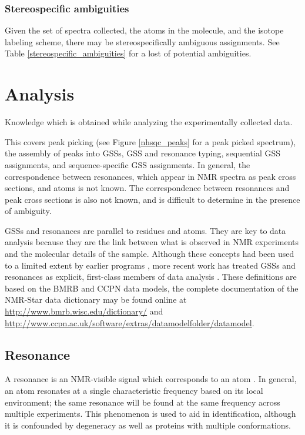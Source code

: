 \subsubsection{Stereospecific ambiguities}
Given the set of spectra collected, the atoms in the molecule, and the isotope
labeling scheme, there may be stereospecifically ambiguous assignments.  See
Table \ref{stereospecific_ambiguities} for a lost of potential ambiguities.



\section{Analysis}
Knowledge which is obtained while analyzing the experimentally collected data.

This covers peak picking (see Figure \ref{nhsqc_peaks} for a peak picked spectrum), 
the assembly of peaks into GSSs, GSS and resonance typing, sequential
GSS assignments, and sequence-specific GSS assignments.
In general, the correspondence between resonances, which appear in NMR 
spectra as peak cross sections, and atoms is not known.  The correspondence 
between resonances and peak cross sections is also not known, and is difficult 
to determine in the presence of ambiguity.

GSSs \cite{saga, ezassign, pistachio, autoassign1997, autoassign2001}
and resonances \cite{ccpn} are parallel to residues and atoms.
They are key to data analysis because they are the link between what is 
observed in NMR experiments and the molecular details of the sample.
Although these concepts had been used to a limited extent by earlier programs
\cite{xeasy, sparky}, more recent work has treated GSSs and resonances as 
explicit, first-class members of data analysis \cite{ccpn, bmrb}.
These definitions are based on the BMRB and CCPN data models,
the complete documentation of the NMR-Star data dictionary may be found online 
at \url{http://www.bmrb.wisc.edu/dictionary/} and
\url{http://www.ccpn.ac.uk/software/extras/datamodelfolder/datamodel}.

\subsection{Resonance}
A resonance is an NMR-visible signal which corresponds to an atom \cite{ccpn}.
In general, an atom resonates at a single characteristic frequency based
on its local environment;  the same resonance will be found at the same 
frequency across multiple experiments.  This phenomenon is used to aid in 
identification, although it is confounded by degeneracy as well as proteins
with multiple conformations.

